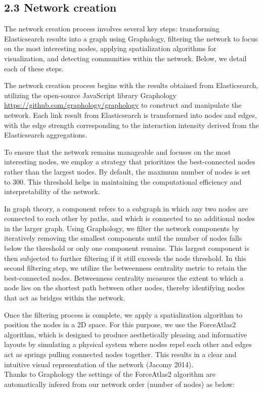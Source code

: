 \documentclass[
]{article}
\begin{document}
\hypertarget{network-creation}{%
\subsection{2.3 Network creation}\label{network-creation}}

The network creation process involves several key steps: transforming
Elasticsearch results into a graph using Graphology, filtering the
network to focus on the most interesting nodes, applying spatialization
algorithms for visualization, and detecting communities within the
network. Below, we detail each of these steps.

The network creation process begins with the results obtained from
Elasticsearch, utilizing the open-source JavaScript library Graphology
\url{https://github.com/graphology/graphology} to construct and
manipulate the network. Each link result from Elasticsearch is
transformed into nodes and edges, with the edge strength corresponding
to the interaction intensity derived from the Elasticsearch
aggregations.

To ensure that the network remains manageable and focuses on the most
interesting nodes, we employ a strategy that prioritizes the
best-connected nodes rather than the largest nodes. By default, the
maximum number of nodes is set to 300. This threshold helps in
maintaining the computational efficiency and interpretability of the
network.

In graph theory, a component refers to a subgraph in which any two nodes
are connected to each other by paths, and which is connected to no
additional nodes in the larger graph. Using Graphology, we filter the
network components by iteratively removing the smallest components until
the number of nodes falls below the threshold or only one component
remains. This largest component is then subjected to further filtering
if it still exceeds the node threshold. In this second filtering step,
we utilize the betweenness centrality metric to retain the
best-connected nodes. Betweenness centrality measures the extent to
which a node lies on the shortest path between other nodes, thereby
identifying nodes that act as bridges within the network.

Once the filtering process is complete, we apply a spatialization
algorithm to position the nodes in a 2D space. For this purpose, we use
the ForceAtlas2 algorithm, which is designed to produce aesthetically
pleasing and informative layouts by simulating a physical system where
nodes repel each other and edges act as springs pulling connected nodes
together. This results in a clear and intuitive visual representation of
the network (Jacomy 2014).\\
Thanks to Graphology the settings of the ForceAtlas2 algorithm are
automatically infered from our network order (number of nodes) as below:
\end{document}
